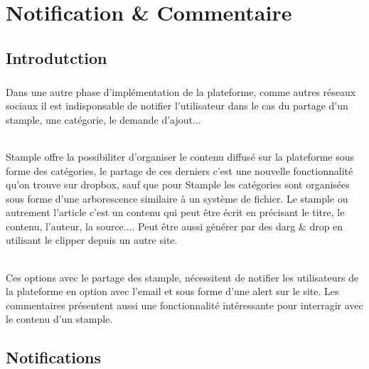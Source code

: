 \chapter{Notification \& Commentaire\\}
\section{Introdutction}
\paragraph{}
Dans une autre phase d'implémentation de la plateforme, comme autres réseaux sociaux il est indisponsable de notifier l'utilisateur dans le cas du partage d'un stample, une catégorie, le demande d'ajout...
\subparagraph{}
Stample offre la possibiliter d'organiser le contenu diffusé sur la plateforme sous forme des catégories, le partage de ces derniers c'est une nouvelle fonctionnalité qu'on trouve sur dropbox, sauf que pour Stample les catégories sont organisées sous forme d'une arborescence similaire à un système de fichier.
\newline
Le stample ou autrement l'article c'est un contenu qui peut être écrit en précisant le titre, le contenu, l'auteur, la source....
Peut être aussi générer par des darg \& drop en utilisant le clipper depuis un autre site.
\subparagraph{}
Ces options avec le partage des stample, nécessitent de notifier les utilisateurs de la plateforme en option avec l'email et sous forme d'une alert sur le site.
\newline
Les commentaires présentent aussi une fonctionnalité intéressante pour interragir avec le contenu d'un stample.
\section{Notifications}
